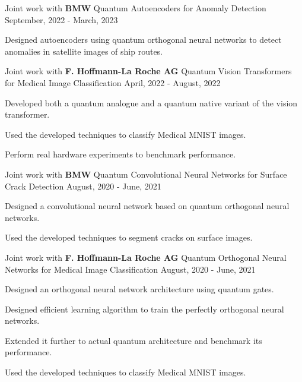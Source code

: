 \begin{cventries}
  \cventry
    {Joint work with \textbf{BMW}} %
    {Quantum Autoencoders for Anomaly Detection} %
    {} %
    {September, 2022 - March, 2023} %
    {
      \begin{cvitems} %
        \item {Designed autoencoders using quantum orthogonal neural networks to detect anomalies in satellite images of ship routes.}
      \end{cvitems}
    }

  \cventry
    {Joint work with \textbf{F. Hoffmann-La Roche AG}} %
    {Quantum Vision Transformers for Medical Image Classification} %
    {} %
    {April, 2022 - August, 2022} %
    {
      \begin{cvitems} %
        \item {Developed both a quantum analogue and a quantum native variant of the vision transformer.}
        \item {Used the developed techniques to classify Medical MNIST images.}
        \item {Perform real hardware experiments to benchmark performance.}
      \end{cvitems}
    }

  \cventry
    {Joint work with \textbf{BMW}} %
    {Quantum Convolutional Neural Networks for Surface Crack Detection} %
    {} %
    {August, 2020 - June, 2021} %
    {
      \begin{cvitems} %
        \item {Designed a convolutional neural network based on quantum orthogonal neural networks.}
        \item {Used the developed techniques to segment cracks on surface images.}
      \end{cvitems}
    }

  \cventry
    {Joint work with \textbf{F. Hoffmann-La Roche AG}} %
    {Quantum Orthogonal Neural Networks for Medical Image Classification} %
    {} %
    {August, 2020 - June, 2021} %
    {
      \begin{cvitems} %
        \item {Designed an orthogonal neural network architecture using quantum gates.}
        \item {Designed efficient learning algorithm to train the perfectly orthogonal neural networks.}
        \item {Extended it further to actual quantum architecture and benchmark its performance.}
        \item {Used the developed techniques to classify Medical MNIST images.}
      \end{cvitems}
    }



\end{cventries}
